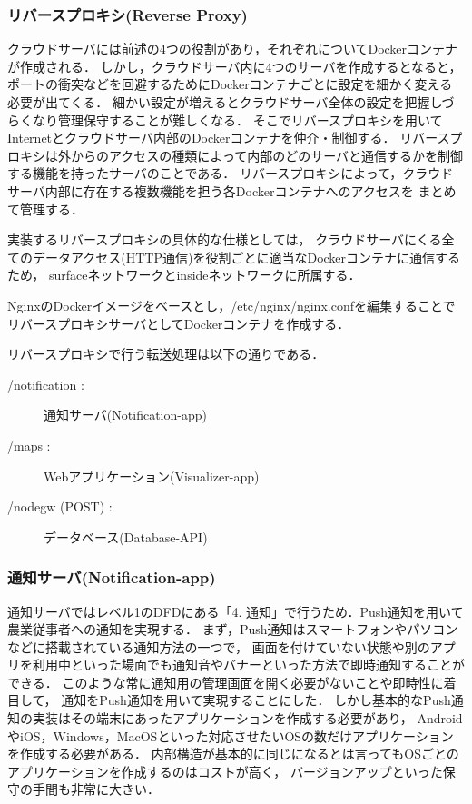 \documentclass[12pt]{honka_v1}
\begin{document}



\subsubsection{リバースプロキシ(Reverse Proxy)}
クラウドサーバには前述の4つの役割があり，それぞれについてDockerコンテナが作成される．
しかし，クラウドサーバ内に4つのサーバを作成するとなると，
ポートの衝突などを回避するためにDockerコンテナごとに設定を細かく変える必要が出てくる．
細かい設定が増えるとクラウドサーバ全体の設定を把握しづらくなり管理保守することが難しくなる．
そこでリバースプロキシを用いてInternetとクラウドサーバ内部のDockerコンテナを仲介・制御する．
リバースプロキシは外からのアクセスの種類によって内部のどのサーバと通信するかを制御する機能を持ったサーバのことである．
リバースプロキシによって，クラウドサーバ内部に存在する複数機能を担う各Dockerコンテナへのアクセスを
まとめて管理する．

実装するリバースプロキシの具体的な仕様としては，
クラウドサーバにくる全てのデータアクセス(HTTP通信)を役割ごとに適当なDockerコンテナに通信するため，
surfaceネットワークとinsideネットワークに所属する．

NginxのDockerイメージをベースとし，/etc/nginx/nginx.confを編集することで
リバースプロキシサーバとしてDockerコンテナを作成する．

リバースプロキシで行う転送処理は以下の通りである．

\begin{description}
    \item[/notification :]    通知サーバ(Notification-app)
    \item[/maps :]            Webアプリケーション(Visualizer-app)
    \item[/nodegw (POST) :]   データベース(Database-API)
\end{description}



\subsubsection{通知サーバ(Notification-app)}
通知サーバではレベル1のDFDにある「4. 通知」で行うため．Push通知を用いて農業従事者への通知を実現する．
まず，Push通知はスマートフォンやパソコンなどに搭載されている通知方法の一つで，
画面を付けていない状態や別のアプリを利用中といった場面でも通知音やバナーといった方法で即時通知することができる．
このような常に通知用の管理画面を開く必要がないことや即時性に着目して，
通知をPush通知を用いて実現することにした．
しかし基本的なPush通知の実装はその端末にあったアプリケーションを作成する必要があり，
AndroidやiOS，Windows，MacOSといった対応させたいOSの数だけアプリケーションを作成する必要がある．
内部構造が基本的に同じになるとは言ってもOSごとのアプリケーションを作成するのはコストが高く，
バージョンアップといった保守の手間も非常に大きい．
\end{document}
